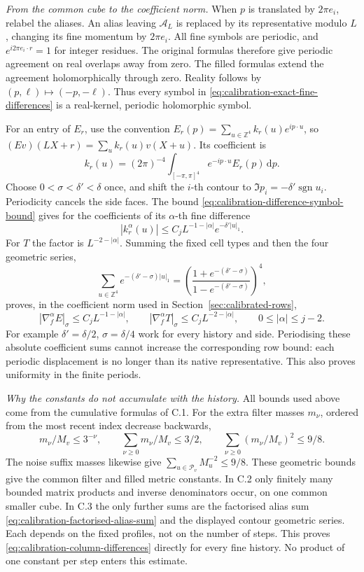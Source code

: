 \documentclass[11pt,reqno]{amsart}
\numberwithin{equation}{section}
\theoremstyle{definition}
\theoremstyle{remark}
\newcommand{\Z}{\mathbb Z}
\newcommand{\dd}{\mathrm d}
\begin{document}
\smallskip\noindent
\emph{From the common cube to the coefficient norm.}
When \(p\) is translated by \(2\pi e_i\), relabel the
aliases. An alias leaving \(\mathcal A_L\) is replaced
by its representative modulo \(L\), changing its fine
momentum by \(2\pi e_i\). All fine symbols are periodic,
and \(e^{i2\pi e_i\cdot r}=1\) for integer residues.
The original formulas therefore give periodic agreement
on real overlaps away from zero. The filled formulas
extend the agreement holomorphically through zero.
Reality follows by \((p,\ell)\mapsto(-p,-\ell)\).
Thus every symbol in
\eqref{eq:calibration-exact-fine-differences} is a real-kernel,
periodic holomorphic symbol.

For an entry of \(E_r\), use the convention
\(E_r(p)=\sum_{u\in\Z^4}k_r(u)e^{ip\cdot u}\), so
\((Ev)(LX+r)=\sum_u k_r(u)v(X+u)\). Its coefficient is
\[
 k_r(u)=(2\pi)^{-4}\int_{[-\pi,\pi]^4}
                                  e^{-ip\cdot u}E_r(p)\,\dd p.
\]
Choose \(0<\sigma<\delta'<\delta\) once, and shift the
\(i\)-th contour to \(\Im p_i=-\delta'\operatorname{sgn}u_i\).
Periodicity cancels the side faces. The bound
\eqref{eq:calibration-difference-symbol-bound} gives for
the coefficients of its \(\alpha\)-th fine difference
\[
 |k_r^\alpha(u)|\le C_jL^{-1-|\alpha|}e^{-\delta'|u|_1}.
\]
For \(T\) the factor is \(L^{-2-|\alpha|}\). Summing
the fixed cell types and then the four geometric series,
\[
 \sum_{u\in\Z^4}e^{-(\delta'-\sigma)|u|_1}
      =\left(\frac{1+e^{-(\delta'-\sigma)}}
                    {1-e^{-(\delta'-\sigma)}}\right)^4,
\]
proves, in the coefficient norm used in Section~\ref{sec:calibrated-rows},
\begin{equation}
 |\nabla_f^\alpha E|_\sigma\le C_jL^{-1-|\alpha|},\qquad
 |\nabla_f^\alpha T|_\sigma\le C_jL^{-2-|\alpha|},
                              \qquad 0\le|\alpha|\le j-2.
 \label{eq:calibration-column-differences}
\end{equation}
For example \(\delta'=\delta/2\), \(\sigma=\delta/4\)
work for every history and side. Periodising these absolute
coefficient sums cannot increase the corresponding row
bound: each periodic displacement is no longer than its
native representative. This also proves uniformity in
the finite periods.

\smallskip\noindent
\emph{Why the constants do not accumulate with the history.}
All bounds used above come from the cumulative formulas
of C.1. For the extra filter masses \(m_\nu\), ordered
from the most recent index decrease backwards,
\[
 m_\nu/M_v\le3^{-\nu},\qquad
 \sum_{\nu\ge0}m_\nu/M_v\le3/2,\qquad
 \sum_{\nu\ge0}(m_\nu/M_v)^2\le9/8.
\]
The noise suffix masses likewise give
\(\sum_{u\in\mathcal P_v}M_u^{-2}\le9/8\).
These geometric bounds give the common filter and filled
metric constants. In C.2 only finitely many bounded
matrix products and inverse denominators occur, on one
common smaller cube. In C.3 the only further sums are the
factorised alias sum \eqref{eq:calibration-factorised-alias-sum}
and the displayed contour geometric series. Each depends
on the fixed profiles, not on the number of steps. This
proves \eqref{eq:calibration-column-differences} directly
for every fine history. No product of one constant per
step enters this estimate.
\end{document}

